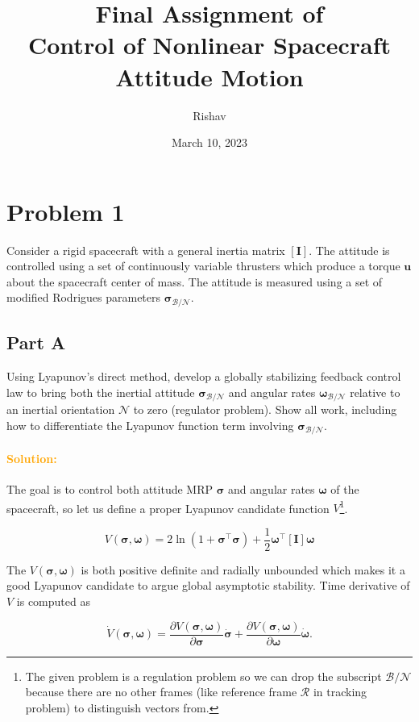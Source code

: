 \documentclass{article}
\title{Final Assignment of\\Control of Nonlinear Spacecraft Attitude Motion}
\author{Rishav}
\date{March 10, 2023}
\begin{document}
\maketitle

\newpage
\section{Problem 1}
Consider a rigid spacecraft with a general inertia matrix $[\bm{I}]$. The attitude is controlled using a set of continuously variable thrusters which produce a torque $\bm{u}$ about the spacecraft center of mass. The attitude is measured using a set of modified Rodrigues parameters $\bm{\sigma}_{\mathcal{B}/\mathcal{N}}$.

\subsection*{Part A}
Using Lyapunov's direct method, develop a globally stabilizing feedback control law to bring both the inertial attitude $\bm{\sigma}_{\mathcal{B}/\mathcal{N}}$ and angular rates $\bm{\omega}_{\mathcal{B}/\mathcal{N}}$ relative to an inertial orientation $\mathcal{N}$ to zero (regulator problem). Show all work, including how to differentiate the Lyapunov function term involving $\bm{\sigma}_{\mathcal{B}/\mathcal{N}}$.

\paragraph{\textcolor{orange}{Solution:}}
The goal is to control both attitude MRP $\bm{\sigma}$ and angular rates $\bm{\omega}$ of the spacecraft, so let us define a proper Lyapunov candidate function $V$\footnote{The given problem is a regulation problem so we can drop the subscript $\mathcal{B}/\mathcal{N}$ because there are no other frames (like reference frame $\mathcal{R}$ in tracking problem) to distinguish vectors from.}. 

$$
V(\bm{\sigma},\bm{\omega})=2\ln{(1+\bm{\sigma}^{\intercal}\bm{\sigma})}+\frac{1}{2}\bm{\omega}^{\intercal}[\bm{I}]\bm{\omega} 
$$

The $V(\bm{\sigma},\bm{\omega})$ is both positive definite and radially unbounded which makes it a good Lyapunov candidate to argue global asymptotic stability. Time derivative of $V$ is computed as

\begin{equation}
  \label{eqn_vdot}
  \dot{V}(\bm{\sigma},\bm{\omega})=\frac{\partial V(\bm{\sigma},\bm{\omega})}{\partial\bm{\sigma}}\dot{\bm{\sigma}}+\frac{\partial V(\bm{\sigma},\bm{\omega})}{\partial\bm{\omega}}\dot{\bm{\omega}}.  
\end{equation}
\end{document}
